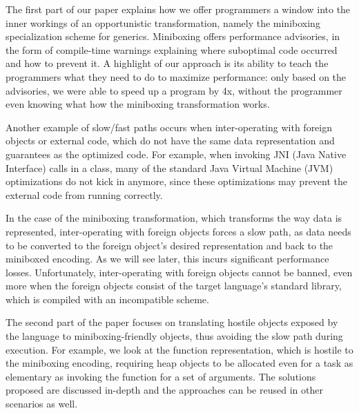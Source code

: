 The first part of our paper explains how we offer programmers a window into the inner workings of an opportunistic transformation, namely the miniboxing specialization scheme for generics. Miniboxing offers performance advisories, in the form of compile-time warnings explaining where suboptimal code occurred and how to prevent it. A highlight of our approach is its ability to teach the programmers what they need to do to maximize performance: only based on the advisories, we were able to speed up a program by 4x, without the programmer even knowing what how the miniboxing transformation works.

Another example of slow/fast paths occurs when inter-operating with foreign objects or external code, which do not have the same data representation and guarantees as the optimized code. For example, when invoking JNI (Java Native Interface) calls in a class, many of the standard Java Virtual Machine (JVM) optimizations do not kick in anymore, since these optimizations may prevent the external code from running correctly.

In the case of the miniboxing transformation, which transforms the way data is represented, inter-operating with foreign objects forces a slow path, as data needs to be converted to the foreign object's desired representation and back to the miniboxed encoding. As we will see later, this incurs significant performance losses. Unfortunately, inter-operating with foreign objects cannot be banned, even more when the foreign objects consist of the target language's standard library, which is compiled with an incompatible scheme.

The second part of the paper focuses on translating hostile objects exposed by the language to miniboxing-friendly objects, thus avoiding the slow path during execution. For example, we look at the function representation, which is hostile to the miniboxing encoding, requiring heap objects to be allocated even for a task as elementary as invoking the function for a set of arguments. The solutions proposed are discussed in-depth and the approaches can be reused in other scenarios as well.






